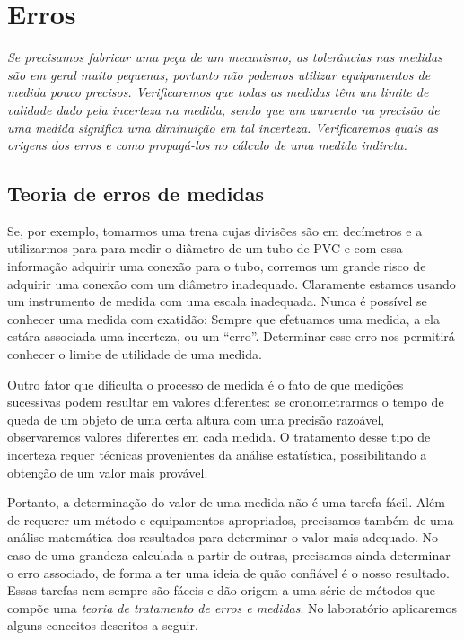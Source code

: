\chapter{Erros}
\label{Chap:Erros}

{\it
Se precisamos fabricar uma peça de um mecanismo, as tolerâncias nas medidas são em geral muito pequenas, portanto não podemos utilizar equipamentos de medida pouco precisos. Verificaremos que todas as medidas têm um limite de validade dado pela incerteza na medida, sendo que um aumento na precisão de uma medida significa uma diminuição em tal incerteza. Verificaremos quais as origens dos erros e como propagá-los no cálculo de uma medida indireta.
}

\section{Teoria de erros de medidas}

Se, por exemplo, tomarmos uma trena cujas divisões são em decímetros e a utilizarmos para para medir o diâmetro de um tubo de PVC e com essa informação adquirir uma conexão para o tubo, corremos um grande risco de adquirir uma conexão com um diâmetro inadequado. Claramente estamos usando um instrumento de medida com uma escala inadequada. Nunca é possível se conhecer uma medida com exatidão: Sempre que efetuamos uma medida, a ela estára associada uma incerteza, ou um ``erro''. Determinar esse erro nos permitirá conhecer o limite de utilidade de uma medida. 

Outro fator que dificulta o processo de medida é o fato de que medições sucessivas podem resultar em valores diferentes: se cronometrarmos o tempo de queda de um objeto de uma certa altura com uma precisão razoável, observaremos valores diferentes em cada medida. O tratamento desse tipo de incerteza requer técnicas provenientes da análise estatística, possibilitando a obtenção de um valor mais provável.

Portanto, a determinação do valor de uma medida não é uma tarefa fácil. Além de requerer um método e equipamentos apropriados, precisamos também de uma análise matemática dos resultados para determinar o valor mais adequado. No caso de uma grandeza calculada a partir de outras, precisamos ainda determinar o erro associado, de forma a ter uma ideia de quão confiável é o nosso resultado. Essas tarefas nem sempre são fáceis e dão origem a uma série de métodos que compõe uma \emph{teoria de tratamento de erros e medidas}. No laboratório aplicaremos alguns conceitos descritos a seguir.

